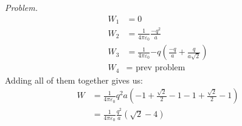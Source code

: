 \documentclass[10pt,oneside]{book}
\newcommand{\gspc}{\vspace{0.13cm}} %
\newenvironment{problem}[1]
  {\vspace{-0.1cm}\begin{tcolorbox}[problembox]
   \textit{Problem. }#1}
  {\end{tcolorbox}\gspc}
\newcommand{\cpr}[1]{\left(#1\right)}
\begin{document}
\begin{enumerate}
\begin{problem}
    \begin{align*}
      W_1 &= 0\\
      W_2 &= \frac{1}{4\pi\varepsilon_0}\frac{-q^2}{a}\\
      W_3 &= \frac{1}{4\pi\varepsilon_0}{-q}\cpr{\frac{-q}{a}+\frac{q}{a\sqrt2}}\\
      W_4&= \text{ prev problem}
    \end{align*}
    Adding all of them together gives us:
    \begin{align*}
      W &= \frac{1}{4\pi\varepsilon_0}{q^2}{a}\cpr{-1+\frac{\sqrt2}2-1-1+\frac{\sqrt2}2-1}\\
      &=\frac{1}{4\pi\varepsilon_0}\frac{q^2}{a}\cpr{\sqrt2 - 4}
    \end{align*}
  \end{problem}
\end{enumerate}
\end{document}
